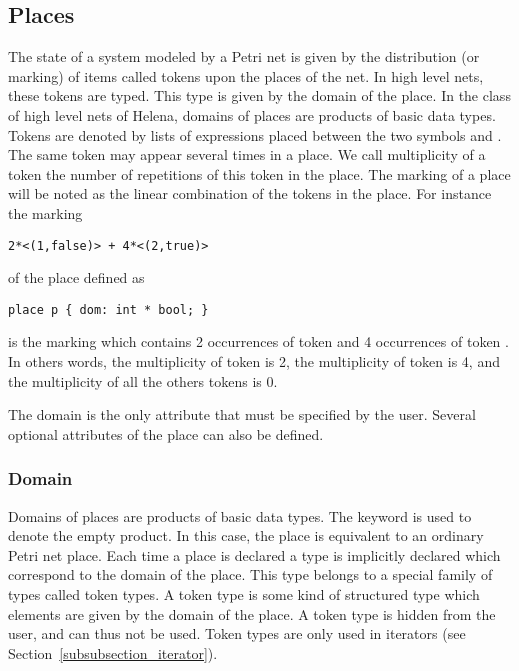 \subsection{Places}
The state of a system modeled by a Petri net is given by the
distribution (or marking) of items called tokens upon the places of
the net.  In high level nets, these tokens are typed.  This type is
given by the domain of the place.  In the class of high level nets of
Helena, domains of places are products of basic data types.  Tokens
are denoted by lists of expressions placed between the two symbols
\LS{<(} and \LS{)>}.  The same token may appear several times in a
place.  We call multiplicity of a token the number of repetitions of
this token in the place.  The marking of a place will be noted as the
linear combination of the tokens in the place.  For instance the
marking
\begin{lstlisting}
2*<(1,false)> + 4*<(2,true)>
\end{lstlisting}
of the place  defined as
\begin{lstlisting}
place p { dom: int * bool; }
\end{lstlisting}
is the marking which contains 2 occurrences of token 
and 4 occurrences of token .  In others words, the
multiplicity of token  is 2, the multiplicity of token
 is 4, and the multiplicity of all the others tokens is
0.

The domain is the only attribute that must be specified by the user.
Several optional attributes of the place can also be defined.\\

\placedef


\subsubsection{Domain}
Domains of places are products of basic data types.  The keyword
 is used to denote the empty product.  In this case, the
place is equivalent to an ordinary Petri net place.  Each time a place
is declared a type is implicitly declared which correspond to the
domain of the place.  This type belongs to a special family of types
called token types.  A token type is some kind of structured type
which elements are given by the domain of the place.  A token type is
hidden from the user, and can thus not be used.  Token types are only
used in iterators (see Section~\ref{subsubsection_iterator}).\\

